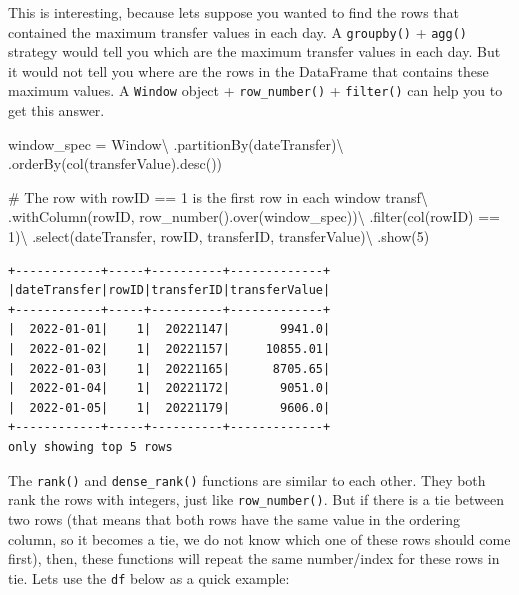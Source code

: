 \documentclass[
  11pt,
  letterpaper,
  DIV=11,
  numbers=noendperiod]{scrreprt}
\newenvironment{Shaded}{\begin{snugshade}}{\end{snugshade}}
\newcommand{\BuiltInTok}[1]{\textcolor[rgb]{0.00,0.23,0.31}{#1}}
\newcommand{\CommentTok}[1]{\textcolor[rgb]{0.37,0.37,0.37}{#1}}
\newcommand{\DecValTok}[1]{\textcolor[rgb]{0.68,0.00,0.00}{#1}}
\newcommand{\NormalTok}[1]{\textcolor[rgb]{0.00,0.23,0.31}{#1}}
\newcommand{\OperatorTok}[1]{\textcolor[rgb]{0.37,0.37,0.37}{#1}}
\newcommand{\StringTok}[1]{\textcolor[rgb]{0.13,0.47,0.30}{#1}}
\begin{document}
This is interesting, because lets suppose you wanted to find the rows
that contained the maximum transfer values in each day. A
\texttt{groupby()} + \texttt{agg()} strategy would tell you which are
the maximum transfer values in each day. But it would not tell you where
are the rows in the DataFrame that contains these maximum values. A
\texttt{Window} object + \texttt{row\_number()} + \texttt{filter()} can
help you to get this answer.

\begin{Shaded}
\begin{Highlighting}[]
\NormalTok{window\_spec }\OperatorTok{=}\NormalTok{ Window}\OperatorTok{\textbackslash{}}
\NormalTok{    .partitionBy(}\StringTok{\textquotesingle{}dateTransfer\textquotesingle{}}\NormalTok{)}\OperatorTok{\textbackslash{}}
\NormalTok{    .orderBy(col(}\StringTok{\textquotesingle{}transferValue\textquotesingle{}}\NormalTok{).desc())}

\CommentTok{\# The row with rowID == 1 is the first row in each window}
\NormalTok{transf}\OperatorTok{\textbackslash{}}
\NormalTok{    .withColumn(}\StringTok{\textquotesingle{}rowID\textquotesingle{}}\NormalTok{, row\_number().over(window\_spec))}\OperatorTok{\textbackslash{}}
\NormalTok{    .}\BuiltInTok{filter}\NormalTok{(col(}\StringTok{\textquotesingle{}rowID\textquotesingle{}}\NormalTok{) }\OperatorTok{==} \DecValTok{1}\NormalTok{)}\OperatorTok{\textbackslash{}}
\NormalTok{    .select(}\StringTok{\textquotesingle{}dateTransfer\textquotesingle{}}\NormalTok{, }\StringTok{\textquotesingle{}rowID\textquotesingle{}}\NormalTok{, }\StringTok{\textquotesingle{}transferID\textquotesingle{}}\NormalTok{, }\StringTok{\textquotesingle{}transferValue\textquotesingle{}}\NormalTok{)}\OperatorTok{\textbackslash{}}
\NormalTok{    .show(}\DecValTok{5}\NormalTok{)}
\end{Highlighting}
\end{Shaded}

\begin{verbatim}
+------------+-----+----------+-------------+
|dateTransfer|rowID|transferID|transferValue|
+------------+-----+----------+-------------+
|  2022-01-01|    1|  20221147|       9941.0|
|  2022-01-02|    1|  20221157|     10855.01|
|  2022-01-03|    1|  20221165|      8705.65|
|  2022-01-04|    1|  20221172|       9051.0|
|  2022-01-05|    1|  20221179|       9606.0|
+------------+-----+----------+-------------+
only showing top 5 rows
\end{verbatim}

The \texttt{rank()} and \texttt{dense\_rank()} functions are similar to
each other. They both rank the rows with integers, just like
\texttt{row\_number()}. But if there is a tie between two rows (that
means that both rows have the same value in the ordering column, so it
becomes a tie, we do not know which one of these rows should come
first), then, these functions will repeat the same number/index for
these rows in tie. Lets use the \texttt{df} below as a quick example:
\end{document}

